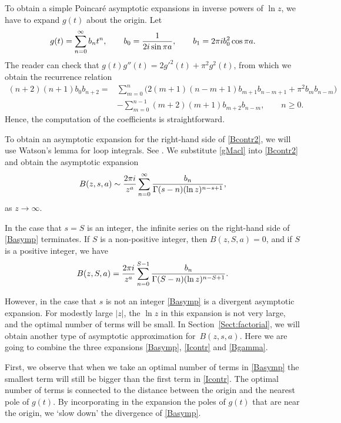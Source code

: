 \documentclass[11pt]{article}
\numberwithin{equation}{section}
\numberwithin{equation}{section}
\def\iunit{{\rm i}}
\begin{document}
To obtain a simple Poincar\'e asymptotic expansions in inverse powers of $\ln z$,
we have to expand $g(t)$ about the origin. Let
\begin{gather}\label{gMacl}
 g(t)=\sum_{n=0}^\infty b_nt^n,\qquad b_0=\frac{1}{2\iunit\sin\pi a},\qquad
 b_1=2\pi\iunit b_0^2\cos\pi a.
\end{gather}
The reader can check that $g(t)g''(t)=2g'^2(t)+\pi^2g^2(t)$, from which we obtain the recurrence relation{\samepage
\begin{align*}%
 (n+2)(n+1)b_0b_{n+2}={}&\sum_{m=0}^n\big(2(m+1)(n-m+1)b_{m+1}b_{n-m+1}
 +\pi^2b_m b_{n-m}\big)\\
 &-\sum_{m=0}^{n-1}(m+2)(m+1)b_{m+2}b_{n-m},\qquad n\geq0.
\end{align*}
 Hence, the computation of the coefficients is straightforward.}

To obtain an asymptotic expansion for the right-hand side of \eqref{Bcontr2},
we will use Watson's lemma for loop integrals. See \cite[Section~4.5.3]{Olver1997}.
We substitute \eqref{gMacl} into \eqref{Bcontr2} and obtain the asymptotic expansion
\begin{equation}\label{Basymp}
 B(z,s,a)\sim \frac{2\pi\iunit}{z^{a}}\sum_{n=0}^\infty
 \frac{b_n}{\Gamma(s-n)(\ln z)^{n-s+1}},
\end{equation}
as $z\to\infty$.

In the case that $s=S$ is an integer, the infinite series on the right-hand side
of \eqref{Basymp} terminates.
If $S$ is a non-positive integer, then $B(z,S,a)=0$, and if $S$ is a positive integer,
we have
\begin{gather*}%
 B(z,S,a)= \frac{2\pi\iunit}{z^{a}}\sum_{n=0}^{S-1}
 \frac{b_n}{\Gamma(S-n)(\ln z)^{n-S+1}}.
\end{gather*}

However, in the case that $s$ is not an integer
\eqref{Basymp} is a divergent asymptotic expansion. For modestly large $|z|$, the $\ln z$ in
this expansion is not very large, and the optimal number of terms will be small.
In Section~\ref{Sect:factorial}, we will obtain another type of asymptotic approximation for~$B(z,s,a)$.
Here we are going to combine the three expansions \eqref{Basymp}, \eqref{Icontr} and \eqref{Bgamma}.

First, we observe that when we take an optimal number of terms in \eqref{Basymp} the smallest term will
still be bigger than the first term in \eqref{Icontr}. The optimal number of terms is connected to the
distance between the origin and the nearest pole of $g(t)$. By incorporating in the expansion
the poles of $g(t)$ that are near the origin, we `slow down' the divergence of \eqref{Basymp}.
\end{document}
